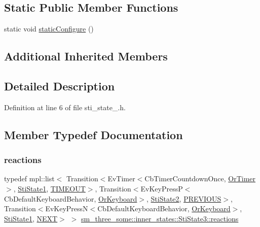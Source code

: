 \subsection*{Static Public Member Functions}
\begin{DoxyCompactItemize}
\item 
static void \hyperlink{structsm__three__some_1_1inner__states_1_1StiState3_a029d93f83c53d16ac347d908dbe87cc2}{static\+Configure} ()
\end{DoxyCompactItemize}
\subsection*{Additional Inherited Members}


\subsection{Detailed Description}


Definition at line 6 of file sti\+\_\+state\+\_.\+h.



\subsection{Member Typedef Documentation}
\mbox{\label{structsm__three__some_1_1inner__states_1_1StiState3_a3c00d8e30a1a01b0783e9dfcf57bfd25}} 
\subsubsection{\texorpdfstring{reactions}{reactions}}
{\footnotesize\ttfamily typedef mpl\+::list$<$ Transition$<$Ev\+Timer$<$Cb\+Timer\+Countdown\+Once, \hyperlink{classsm__three__some_1_1OrTimer}{Or\+Timer}$>$, \hyperlink{structsm__three__some_1_1inner__states_1_1StiState1}{Sti\+State1}, \hyperlink{structsm__three__some_1_1inner__states_1_1StiState3_1_1TIMEOUT}{T\+I\+M\+E\+O\+UT}$>$, Transition$<$Ev\+Key\+PressP$<$Cb\+Default\+Keyboard\+Behavior, \hyperlink{classsm__three__some_1_1OrKeyboard}{Or\+Keyboard}$>$, \hyperlink{structsm__three__some_1_1inner__states_1_1StiState2}{Sti\+State2}, \hyperlink{structsm__three__some_1_1inner__states_1_1StiState3_1_1PREVIOUS}{P\+R\+E\+V\+I\+O\+US}$>$, Transition$<$Ev\+Key\+PressN$<$Cb\+Default\+Keyboard\+Behavior, \hyperlink{classsm__three__some_1_1OrKeyboard}{Or\+Keyboard}$>$, \hyperlink{structsm__three__some_1_1inner__states_1_1StiState1}{Sti\+State1}, \hyperlink{structsm__three__some_1_1inner__states_1_1StiState3_1_1NEXT}{N\+E\+XT}$>$ $>$ \hyperlink{structsm__three__some_1_1inner__states_1_1StiState3_a3c00d8e30a1a01b0783e9dfcf57bfd25}{sm\+\_\+three\+\_\+some\+::inner\+\_\+states\+::\+Sti\+State3\+::reactions}}



